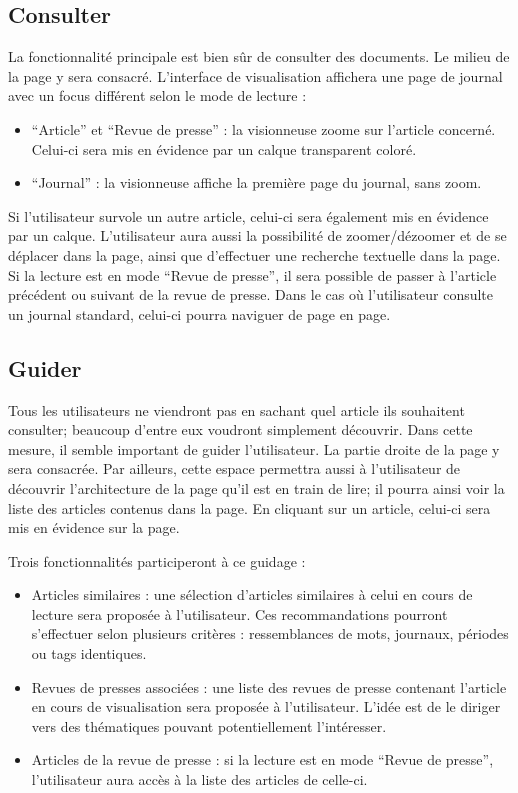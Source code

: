 \subsection{Consulter}
\label{sec:consultation_consulter}
La fonctionnalité principale est bien sûr de consulter des documents. Le milieu de la page y sera consacré.
L’interface de visualisation affichera une page de journal avec un focus différent selon le mode de lecture :
\begin{itemize}
\item “Article” et “Revue de presse” : la visionneuse zoome sur l’article concerné. Celui-ci sera mis en évidence par un calque transparent coloré.
\item “Journal” : la visionneuse affiche la première page du journal, sans zoom.
\end{itemize}
Si l’utilisateur survole un autre article, celui-ci sera également mis en évidence par un calque.
	L’utilisateur aura aussi la possibilité de zoomer/dézoomer et de se déplacer dans la page, ainsi que d’effectuer une recherche textuelle dans la page. Si la lecture est en mode “Revue de presse”, il sera possible de passer à l’article précédent ou suivant de la revue de presse. Dans le cas où l'utilisateur consulte un journal standard, celui-ci pourra naviguer de page en page.

\subsection{Guider}
\label{sec:consultation_guider}

	Tous les utilisateurs ne viendront pas en sachant quel article ils souhaitent consulter; beaucoup d’entre eux voudront simplement découvrir. Dans cette mesure, il semble important de guider l’utilisateur. La partie droite de la page y sera consacrée. Par ailleurs, cette espace permettra aussi à l'utilisateur de découvrir l'architecture de la page qu'il est en train de lire; il pourra ainsi voir la liste des articles contenus dans la page. En cliquant sur un article, celui-ci sera mis en évidence sur la page.

	Trois fonctionnalités participeront à ce guidage :
\begin{itemize}
\item Articles similaires : une sélection d’articles similaires à celui en cours de lecture sera proposée à l’utilisateur. Ces recommandations pourront s’effectuer selon plusieurs critères : ressemblances de mots, journaux, périodes ou tags identiques.
\item Revues de presses associées : une liste des revues de presse contenant l’article en cours de visualisation sera proposée à l’utilisateur. L’idée est de le diriger vers des thématiques pouvant potentiellement l’intéresser.
\item Articles de la revue de presse : si la lecture est en mode “Revue de presse”, l’utilisateur aura accès à la liste des articles de celle-ci.
\end{itemize}

